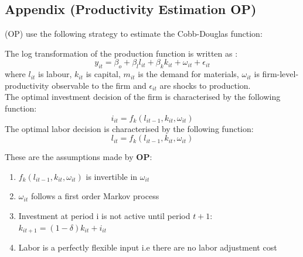 \documentclass[12pt]{article}
\begin{document}
\subsection{Appendix (Productivity Estimation OP)}\label{prodest}
\label{op}

 \textcite{olley1992dynamics} (OP) use the
following strategy to estimate the Cobb-Douglas function: 


The log transformation of the production function is written as : 
\begin{equation}
y_{it} = \beta_{o} + \beta_{l}l_{it} + \beta_{k}k_{it} + \omega_{it} + \epsilon_{it} 
\end{equation}
where $l_{it}$ is labour, $k_{it}$ is capital, $m_{it}$  is
the demand for materials, $\omega_{it}$ is firm-level-productivity
observable to the firm and $\epsilon_{it}$ are shocks to production.\\
The optimal investment decision of the firm is characterised by the following
function:
\begin{equation}
i_{it}= f_{k}(l_{it-1}, k_{it}, \omega_{it})
\end{equation}
The optimal labor decision is characterised by the following function:
\begin{equation}
l_{it}= f_{k}(l_{it-1}, k_{it}, \omega_{it})
\end{equation}

These are the assumptions made by \textbf{OP}:
\begin{enumerate}
\item $f_{k}(l_{it-1}, k_{it}, \omega_{it})$ is invertible in
  $\omega_{it}$
\item $\omega_{it}$ follows a first order Markov process 
\item Investment at period i is not active until period $t+1$:
  $k_{it+1}= (1-\delta)k_{it} + i_{it}$
\item Labor is a perfectly flexible input i.e there are no labor
  adjustment cost
\end{enumerate}
\end{document}

